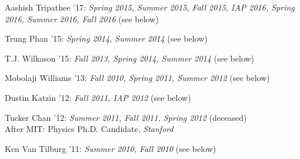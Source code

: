 \item Aashish Tripathee '17: \emph{Spring 2015, Summer 2015, Fall 2015, IAP 2016, Spring 2016, Summer 2016, Fall 2016} (see below) 

\item Trung Phan '15: \emph{Spring 2014, Summer 2014} (see below) 

\item T.J. Wilkason '15: \emph{Fall 2013, Spring 2014, Summer 2014} (see below) 

\item Mobolaji Williams '13: \emph{Fall 2010, Spring 2011, Summer 2012} (see below) 

\item Dustin Katzin '12: \emph{Fall 2011, IAP 2012} (see below) 

\item Tucker Chan '12: \emph{Summer 2011, Fall 2011, Spring 2012} (deceased) 
\\ After MIT: Physics Ph.D. Candidate, \emph{Stanford}

\item Ken Van Tilburg '11: \emph{Summer 2010, Fall 2010} (see below) 

\el
